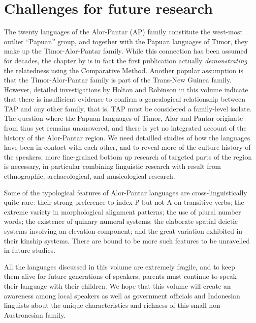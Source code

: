 \section{Challenges for future research}\label{sec:1:7}

The twenty languages of the Alor-Pantar (AP) family constitute the west-most outlier ``Papuan'' group, and together with the Papuan languages of Timor, they make up the Timor-Alor-Pantar family. While this connection has been assumed for decades, the chapter by \citet{SchapperEtAltimor} is in fact the first publication actually \textit{demonstrating} the relatedness using the Comparative Method. Another popular assumption is that the Timor-Alor-Pantar family is part of the Trans-New Guinea family. However, detailed investigations by Holton and Robinson in this volume indicate that there is insufficient evidence to confirm a genealogical relationship between TAP and any other family, that is, TAP must be considered a family-level isolate. The question where the Papuan languages of Timor, Alor and Pantar originate from thus yet remains unanswered, and there is yet no integrated account of the history of the Alor-Pantar region. We need detailled studies of how the languages have been in contact with each other, and to reveal more of the culture history of the speakers, more fine-grained bottom up research of targeted parts of the region is necessary, in particular combining linguistic research with result from ethnographic, archaeological, and musicological research. 

Some of the typological features of Alor-Pantar languages are cross-linguistically quite rare: their strong preference to index P but not A on transitive verbs; the extreme variety in morphological alignment patterns; the use of plural number words; the existence of quinary numeral systems; the elaborate spatial deictic systems involving an elevation component; and the great variation exhibited in their kinship systems. There are bound to be more such features to be unravelled in future studies.

All the languages discussed in this volume are extremely fragile, and to keep them alive for future generations of speakers, parents must continue to speak their language with their children. We hope that this volume will create an awareness among local speakers as well as government officials and Indonesian linguists about the unique characteristics and richness of this small non-Austronesian family.

